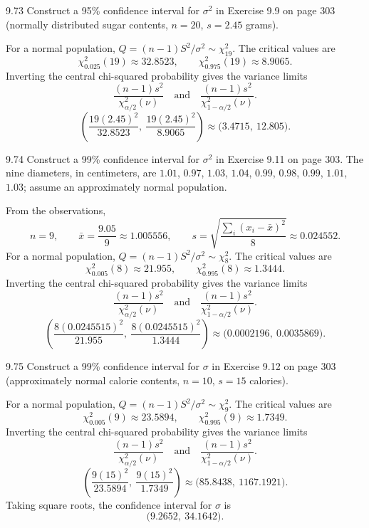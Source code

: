 \documentclass[11pt,oneside]{article}
\begin{document}
\begin{exercise}{9.73}
Construct a 95\% confidence interval for $\sigma^2$ in Exercise 9.9 on page 303 (normally distributed sugar contents, $n=20$, $s=2.45$ grams).
\end{exercise}
\begin{solution}
For a normal population, $Q=(n-1)S^2/\sigma^2\sim\chi^2_{19}$. The critical values are
\[
\chi^2_{0.025}(19)\approx32.8523,\qquad\chi^2_{0.975}(19)\approx8.9065.
\]
Inverting the central chi-squared probability gives the variance limits
\[
\frac{(n-1)s^2}{\chi^2_{\alpha/2}(\nu)}\quad\text{and}\quad\frac{(n-1)s^2}{\chi^2_{1-\alpha/2}(\nu)}.
\]
\[
\left(\frac{19(2.45)^2}{32.8523},\ \frac{19(2.45)^2}{8.9065}\right)\approx\boxed{\bigl(3.4715,\ 12.805\bigr)}.
\]
\end{solution}

\begin{exercise}{9.74}
Construct a 99\% confidence interval for $\sigma^2$ in Exercise 9.11 on page 303. The nine diameters, in centimeters, are $1.01$, $0.97$, $1.03$, $1.04$, $0.99$, $0.98$, $0.99$, $1.01$, $1.03$; assume an approximately normal population.
\end{exercise}
\begin{solution}
From the observations, 
\[
n=9,\qquad\bar x=\frac{9.05}{9}\approx1.005556,\qquad s=\sqrt{\frac{\sum_i(x_i-\bar x)^2}{8}}\approx0.024552.
\]
For a normal population, $Q=(n-1)S^2/\sigma^2\sim\chi^2_{8}$. The critical values are
\[
\chi^2_{0.005}(8)\approx21.955,\qquad\chi^2_{0.995}(8)\approx1.3444.
\]
Inverting the central chi-squared probability gives the variance limits
\[
\frac{(n-1)s^2}{\chi^2_{\alpha/2}(\nu)}\quad\text{and}\quad\frac{(n-1)s^2}{\chi^2_{1-\alpha/2}(\nu)}.
\]
\[
\left(\frac{8(0.0245515)^2}{21.955},\ \frac{8(0.0245515)^2}{1.3444}\right)\approx\boxed{\bigl(0.0002196,\ 0.0035869\bigr)}.
\]
\end{solution}

\begin{exercise}{9.75}
Construct a 99\% confidence interval for $\sigma$ in Exercise 9.12 on page 303 (approximately normal calorie contents, $n=10$, $s=15$ calories).
\end{exercise}
\begin{solution}
For a normal population, $Q=(n-1)S^2/\sigma^2\sim\chi^2_{9}$. The critical values are
\[
\chi^2_{0.005}(9)\approx23.5894,\qquad\chi^2_{0.995}(9)\approx1.7349.
\]
Inverting the central chi-squared probability gives the variance limits
\[
\frac{(n-1)s^2}{\chi^2_{\alpha/2}(\nu)}\quad\text{and}\quad\frac{(n-1)s^2}{\chi^2_{1-\alpha/2}(\nu)}.
\]
\[
\left(\frac{9(15)^2}{23.5894},\ \frac{9(15)^2}{1.7349}\right)\approx\bigl(85.8438,\ 1167.1921\bigr).
\]
Taking square roots, the confidence interval for $\sigma$ is
\[
\boxed{\bigl(9.2652,\ 34.1642\bigr)}.
\]
\end{solution}
\end{document}
